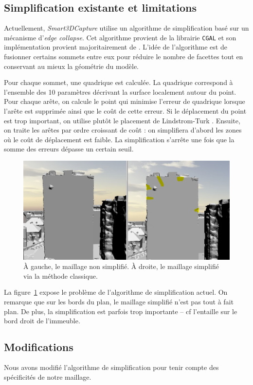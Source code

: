 ﻿\documentclass[12pt, twoside]{article}
\begin{document}
\subsection{Simplification existante et limitations}
Actuellement, \textit{Smart3DCapture} utilise un algorithme de simplification basé sur un mécanisme d'\textit{edge collapse}. Cet algorithme provient de la librairie \texttt{CGAL} et son implémentation provient majoritairement de \cite{simp1, simp2}. L'idée de l'algorithme est de fusionner certains sommets entre eux pour réduire le nombre de facettes tout en conservant au mieux la géométrie du modèle.

Pour chaque sommet, une quadrique est calculée. La quadrique correspond à l'ensemble des 10 paramètres décrivant la surface localement autour du point. Pour chaque arête, on calcule le point qui minimise l'erreur de quadrique lorsque l'arête est supprimée ainsi que le coût de cette erreur. Si le déplacement du point est trop important, on utilise plutôt le placement de Lindstrom-Turk \cite{simp2}. Ensuite, on traite les arêtes par ordre croissant de coût : on simplifiera d'abord les zones où le coût de déplacement est faible. La simplification s'arrête une fois que la somme des erreurs dépasse un certain seuil.

\begin{figure}[h]
\centering
\includegraphics[scale=0.33]{Simpli1.png}
\caption{\label{fig:simpl1} À gauche, le maillage non simplifié. À droite, le maillage simplifié via la méthode classique.}
\end{figure}

La figure~\ref{fig:simpl1} expose le problème de l'algorithme de simplification actuel. On remarque que sur les bords du plan, le maillage simplifié n'est pas tout à fait plan. De plus, la simplification est parfois trop importante -- cf l'entaille sur le bord droit de l'immeuble.

\subsection{Modifications}
Nous avons modifié l'algorithme de simplification pour tenir compte des spécificités de notre maillage.
\end{document}
